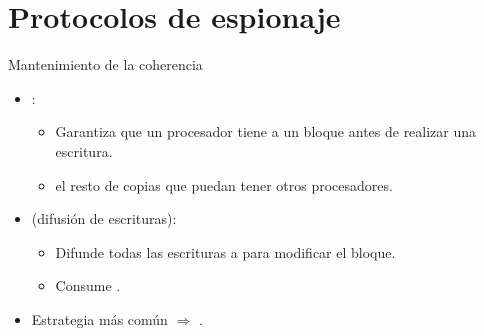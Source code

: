 \section{Protocolos de espionaje}

\begin{frame}[t]{Mantenimiento de la coherencia}
\begin{itemize}
  \item {}:
    \begin{itemize}
      \item Garantiza que un procesador tiene  
            a un bloque antes de realizar una escritura.
      \item {} el resto de copias que puedan tener otros procesadores.
    \end{itemize}

  \item {} (difusión de escrituras):
    \begin{itemize}
      \item Difunde todas las escrituras a  para modificar el bloque.
      \item Consume .
    \end{itemize}

  \item Estrategia más común $\Rightarrow$ .
\end{itemize}
\end{frame}


